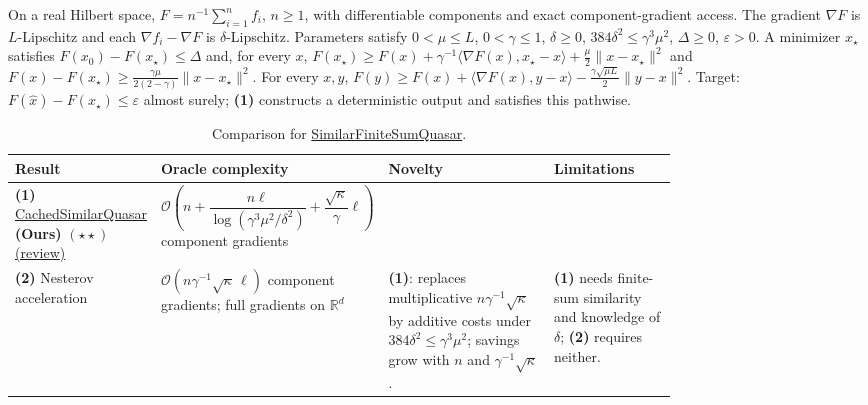 \begin{table}[tp]
\centering
\caption{Comparison for \href{https://github.com/k3nfalt/longtails/blob/main/LongTails/Setups/SimilarFiniteSumQuasar.lean}{SimilarFiniteSumQuasar}.}\label{tab:SimilarFiniteSumQuasar}
\parbox{\linewidth}{\footnotesize
On a real Hilbert space, $F=n^{-1}\sum_{i=1}^{n}f_i$, $n\ge1$, with differentiable components and exact component-gradient access. The gradient $\nabla F$ is $L$-Lipschitz and each $\nabla f_i-\nabla F$ is $\delta$-Lipschitz. Parameters satisfy $0<\mu\le L$, $0<\gamma\le1$, $\delta\ge0$, $384\delta^2\le\gamma^3\mu^2$, $\Delta\ge0$, $\varepsilon>0$. A minimizer $x_\star$ satisfies $F(x_0)-F(x_\star)\le\Delta$ and, for every $x$, $F(x_\star)\ge F(x)+\gamma^{-1}\langle\nabla F(x),x_\star-x\rangle+\frac{\mu}{2}\|x-x_\star\|^2$ and $F(x)-F(x_\star)\ge\frac{\gamma\mu}{2(2-\gamma)}\|x-x_\star\|^2$.
For every $x,y$, $F(y)\ge F(x)+\langle\nabla F(x),y-x\rangle-\frac{\gamma\sqrt{\mu L}}{2}\|y-x\|^2$.
Target: $F(\widehat x)-F(x_\star)\le\varepsilon$ almost surely; \textbf{(1)} constructs a deterministic output and satisfies this pathwise.}\par\smallskip
\begin{threeparttable}
\footnotesize
\setlength{\tabcolsep}{4pt}\renewcommand{\arraystretch}{1.25}
\begin{tabularx}{\linewidth}{@{}>{\raggedright\arraybackslash}p{0.20\linewidth}>{\raggedright\arraybackslash}p{0.32\linewidth}>{\raggedright\arraybackslash}p{0.25\linewidth}>{\raggedright\arraybackslash}X@{}}
\toprule
\textbf{Result} & \textbf{Oracle complexity} & \textbf{Novelty} & \textbf{Limitations} \\
\midrule
\textbf{(1)} \href{https://github.com/k3nfalt/longtails/blob/main/LongTails/Theorems/CachedSimilarQuasar.lean}{Cached\allowbreak Similar\allowbreak Quasar} \textbf{(Ours)} $(\star\star)$ \href{https://github.com/k3nfalt/longtails/blob/main/scripts/reviews/CachedSimilarQuasar.md}{(review)}
& $\mathcal{O}\!\left(n+\dfrac{n\ell}{\log(\gamma^3\mu^2/\delta^2)}+\dfrac{\sqrt{\kappa}}{\gamma}\ell\right)$ component gradients
& & \\
\midrule[1.2pt]
\textbf{(2)} Nesterov acceleration \citep[Theorem 2, v3]{sfqHermant2026v3}
& $\mathcal{O}\!\left(n\gamma^{-1}\sqrt{\kappa}\,\ell\right)$ component gradients; full gradients on $\mathbb{R}^d$
& \textbf{(1)}: replaces multiplicative $n\gamma^{-1}\sqrt{\kappa}$ by additive costs under $384\delta^2\le\gamma^3\mu^2$; savings grow with $n$ and $\gamma^{-1}\sqrt{\kappa}$.
& \textbf{(1)} needs finite-sum similarity and knowledge of $\delta$; \textbf{(2)} requires neither. \\

\end{tabularx}
\end{threeparttable}
\end{table}
